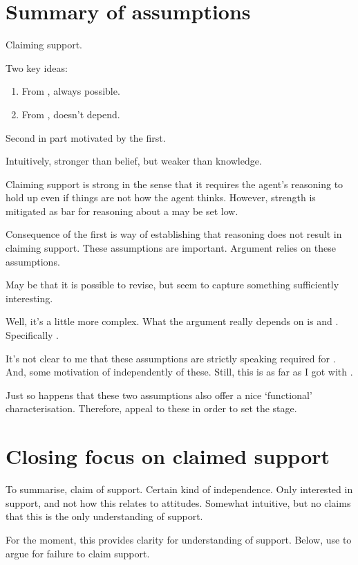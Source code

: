 \section{Summary of assumptions}

\begin{note}
  Claiming support.

  Two key ideas:

  \begin{enumerate}
  \item From \nfcs{}, always possible.
  \item From \eiS{}, doesn't depend.
  \end{enumerate}
  Second in part motivated by the first.

  Intuitively, stronger than belief, but weaker than knowledge.

  {
    \color{red}
    Claiming support is strong in the sense that it requires the agent's reasoning to hold up even if things are not how the agent thinks.
    However, strength is mitigated as bar for reasoning about a \requ{} may be set low.
  }

  Consequence of the first is way of establishing that reasoning does not result in claiming support.
  These assumptions are important.
  Argument relies on these assumptions.

  May be that it is possible to revise, but seem to capture something sufficiently interesting.
\end{note}

\begin{note}
  Well, it's a little more complex.
  What the argument really depends on is \ESU{} and \nI{}.
  Specifically \nI{}.

  It's not clear to me that these assumptions are strictly speaking required for \nI{}.
  And, some motivation of \nI{} independently of these.
  Still, this is as far as I got with \nI{}.

  Just so happens that these two assumptions also offer a nice `functional' characterisation.
  Therefore, appeal to these in order to set the stage.
\end{note}

\section{Closing focus on claimed support}

\begin{note}
  To summarise, claim of support.
  Certain kind of independence.
  Only interested in support, and not how this relates to attitudes.
  Somewhat intuitive, but no claims that this is the only understanding of support.

  For the moment, this provides clarity for understanding of support.
  Below, use to argue for failure to claim support.
\end{note}


